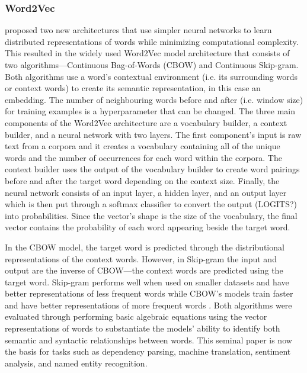 \subsubsection{Word2Vec}
\citet{mikolov2013efficient} proposed two new architectures that use simpler neural networks to learn distributed representations of words while minimizing computational complexity. This resulted in the widely used Word2Vec model architecture that consists of two algorithms—Continuous Bag-of-Words (CBOW) and Continuous Skip-gram. Both algorithms use a word’s contextual environment (i.e. its surrounding words or context words) to create its semantic representation, in this case an embedding. The number of neighbouring words before and after (i.e. window size) for training examples is a hyperparameter that can be changed. The three main components of the Word2Vec architecture are a vocabulary builder, a context builder, and a neural network with two layers. The first component’s input is raw text from a corpora and it creates a vocabulary containing all of the unique words and the number of occurrences for each word within the corpora. The context builder uses the output of the vocabulary builder to create word pairings before and after the target word depending on the context size. Finally, the neural network consists of an input layer, a hidden layer, and an output layer which is then put through a softmax classifier to convert the output (LOGITS?) into probabilities. Since the vector’s shape is the size of the vocabulary, the final vector contains the probability of each word appearing beside the target word. 

In the CBOW model, the target word is predicted through the distributional representations of the context words. However, in Skip-gram the input and output are the inverse of CBOW—the context words are predicted using the target word.  Skip-gram performs well when used on smaller datasets and have better representations of less frequent words while CBOW’s models train faster and have better representations of more frequent words \citep{mikolov2013efficient}. Both algorithms were evaluated through performing basic algebraic equations using the vector representations of words to substantiate the models’ ability to identify both semantic and syntactic relationships between words. This seminal paper is now the basis for tasks such as dependency parsing, machine translation, sentiment analysis, and named entity recognition.


